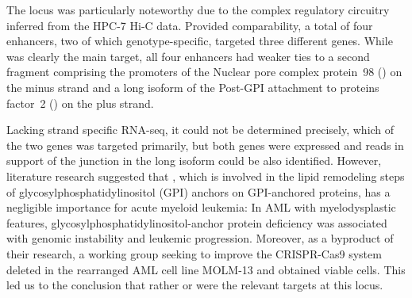 The locus was particularly noteworthy due to the complex regulatory circuitry inferred from the HPC-7 Hi-C data. Provided comparability, a total of four enhancers, two of which genotype-specific, targeted three different genes. While  was clearly the main target, all four enhancers had weaker ties to a second fragment comprising the promoters of the Nuclear pore complex protein~98 () on the minus strand and a long isoform of the Post-GPI attachment to proteins factor~2 () on the plus strand. 

Lacking strand specific RNA-seq, it could not be determined precisely, which of the two genes was targeted primarily, but both genes were expressed and reads in support of the junction in the long  isoform could be also identified. However, literature research suggested that , which is involved in the lipid remodeling steps of glycosylphosphatidylinositol (GPI) anchors on GPI-anchored proteins, has a negligible importance for acute myeloid leukemia: In AML with myelodysplastic features, glycosylphosphatidylinositol-anchor protein deficiency was associated with genomic instability and leukemic progression\cite{Teye2017}. Moreover, as a byproduct of their research, a working group seeking to improve the CRISPR-Cas9 system\cite{Metzakopian2017} deleted  in the \mllafnine rearranged AML cell line MOLM-13\cite{Matsuo1997} and obtained viable cells. This led us to the conclusion that rather  or  were the relevant targets at this locus.

